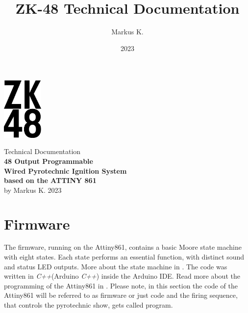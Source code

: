 

\title{ZK-48 Technical Documentation}
\author{Markus K.}
\date{2023}

%



\begin{titlepage}
\begin{center}
\vspace*{1cm}
\includegraphics[width=2cm]{./Figures/zk_48_logo.png}
\vspace*{1cm}

\Huge {Technical Documentation\\} 
\vspace*{1cm}
\Huge{\textbf{48 Output Programmable\\ Wired Pyrotechnic Ignition System\\ based on the ATTINY 861\\}}
\vspace*{0.5cm} 
\Large{by Markus K.}
\vspace*{0.5cm}
\Large{2023}

\end{center}
\end{titlepage}

\pagebreak 

\tableofcontents

\pagebreak



%



\section{Firmware}
\label{Firmware}
The firmware, running on the Attiny861, contains a basic Moore state machine with eight states. Each state performs an essential function, with distinct sound and status LED outputs. More about the state machine in . The code was written in \textit{C++}(Arduino \textit{C++}) inside the Arduino IDE. Read more about the programming of the Attiny861 in . Please note, in this section the code of the Attiny861 will be referred to as firmware or just code and the firing sequence, that controls the pyrotechnic show, gets called program.


